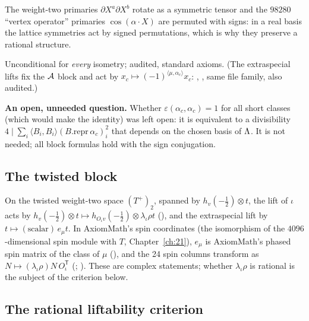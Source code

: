 \begin{physics}
The weight-two primaries $\partial X^a\partial X^b$ rotate as a symmetric tensor and the $98280$ ``vertex operator''
primaries $\cos(\alpha\cdot X)$ are permuted with signs: in a real basis the lattice symmetries act by signed
permutations, which is why they preserve a rational structure.
\end{physics}
\begin{status}Unconditional for \emph{every} isometry; audited, standard axioms.  (The extraspecial lifts fix the
$\mathcal{A}$ block and act by $x_c\mapsto(-1)^{\langle\mu,\alpha_c\rangle}x_c$: ,
, same file family, also audited.)\end{status}

\begin{warning}
\textbf{An open, unneeded question.}  Whether $\varepsilon(\alpha_c,\alpha_c)=1$ for all short classes (which would make
 the identity) was left open: it is equivalent to a divisibility $4\mid\sum_i\langle B_i,B_i\rangle
(B.\mathrm{repr}\,\alpha_c)_i^2$ that depends on the chosen basis of ${\Lambda}$.  It is not needed; all block formulas hold
with the sign conjugation.
\end{warning}

\subsection{The twisted block}

On the twisted weight-two space $(T^+)_2$, spanned by $h_v(-\tfrac12)\otimes t$, the lift of $\iota$ acts by
$h_v(-\tfrac12)\otimes t\mapsto h_{O_\iota v}(-\tfrac12)\otimes \lambda_\iota\rho t$ (), and the extraspecial lift by
$t\mapsto(\text{scalar})\,e_\mu t$.  In AxiomMath's spin coordinates (the isomorphism  of the
$4096$-dimensional spin module with $T$, Chapter~\ref{ch:21}), $e_\mu$ is AxiomMath's phased spin matrix
 of the class of $\mu$ (), and the 24 spin columns transform as $N\mapsto
(\lambda_\iota\rho)N\,O_\iota^{\mathsf T}$ (; ).  These are
complex statements; whether $\lambda_\iota\rho$ is rational is the subject of the criterion below.

\subsection{The rational liftability criterion}

